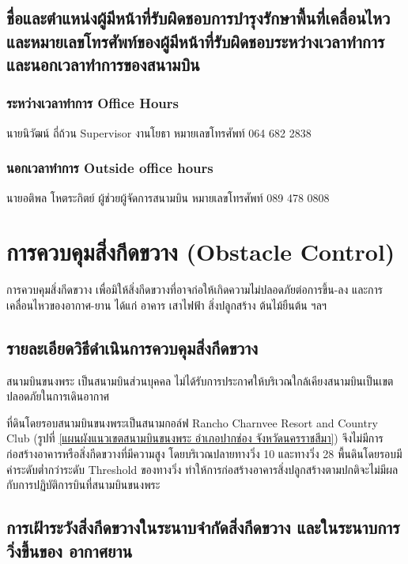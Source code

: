 \subsection{ชื่อและตำแหน่งผู้มีหน้าที่รับผิดชอบการบำรุงรักษาพื้นที่เคลื่อนไหว และหมายเลขโทรศัพท์ของผู้มีหน้าที่รับผิดชอบระหว่างเวลาทำการและนอกเวลาทำการของสนามบิน} \label{ชื่อและตำแหน่งผู้มีหน้าที่รับผิดชอบการบำรุงรักษาพื้นที่เคลื่อนไหว และหมายเลขโทรศัพท์ของผู้มีหน้าที่รับผิดชอบระหว่างเวลาทำการและนอกเวลาทำการของสนามบิน}

\subsubsection{ระหว่างเวลาทำการ Office Hours}

นายนิวัฒน์ ถี่ถ้วน Supervisor งานโยธา 	หมายเลขโทรศัพท์ 064 682 2838

\subsubsection{นอกเวลาทำการ Outside office hours}

นายอติพล โหตระกิตย์ ผู้ช่วยผู้จัดการสนามบิน	หมายเลขโทรศัพท์ 089 478 0808

\section{การควบคุมสิ่งกีดขวาง (Obstacle Control)}

การควบคุมสิ่งกีดขวาง เพื่อมิให้สิ่งกีดขวางที่อาจก่อให้เกิดความไม่ปลอดภัยต่อการขึ้น-ลง และการเคลื่อนไหวของอากาศ-ยาน ได้แก่ อาคาร เสาไฟฟ้า สิ่งปลูกสร้าง ต้นไม้ยืนต้น ฯลฯ

\subsection{รายละเอียดวิธีดำเนินการควบคุมสิ่งกีดขวาง}

สนามบินขนงพระ เป็นสนามบินส่วนบุคคล ไม่ได้รับการประกาศให้บริเวณใกล้เคียงสนามบินเป็นเขตปลอดภัยในการเดินอากาศ

ที่ดินโดยรอบสนามบินขนงพระเป็นสนามกอล์ฟ Rancho Charnvee Resort and Country Club (รูปที่ \ref{แผนผังแนวเขตสนามบินขนงพระ อำเภอปากช่อง จังหวัดนครราชสีมา}) จึงไม่มีการก่อสร้างอาคารหรือสิ่งกีดขวางที่มีความสูง โดยบริเวณปลายทางวิ่ง 10 และทางวิ่ง 28 พื้นดินโดยรอบมีค่าระดับต่ำกว่าระดับ Threshold ของทางวิ่ง ทำให้การก่อสร้างอาคารสิ่งปลูกสร้างตามปกติจะไม่มีผลกับการปฏิบัติการบินที่สนามบินขนงพระ

\subsection{การเฝ้าระวังสิ่งกีดขวางในระนาบจำกัดสิ่งกีดขวาง และในระนาบการวิ่งขึ้นของ
อากาศยาน}\label{การเฝ้าระวังสิ่งกีดขวางในระนาบจำกัดสิ่งกีดขวาง และในระนาบการวิ่งขึ้นของ
อากาศยาน}

